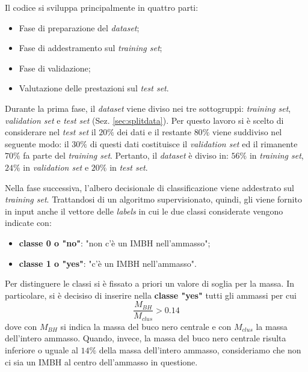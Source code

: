 Il codice si sviluppa principalmente in quattro parti:
\begin{itemize}
    \item Fase di preparazione del \textit{dataset};
    \item Fase di addestramento sul \textit{training set};
    \item Fase di validazione;
    \item Valutazione delle prestazioni sul \textit{test set}.
\end{itemize}

Durante la prima fase, il \textit{dataset} viene diviso nei tre sottogruppi: \textit{training set}, \textit{validation set} e \textit{test set} (Sez. \ref{sec:splitdata}).
Per questo lavoro si è scelto di considerare nel \textit{test set} il $20\%$ dei dati e il restante $80\%$ viene suddiviso nel seguente modo: il $30\%$ di questi dati costituisce il \textit{validation set} ed il rimanente $70\%$ fa parte del \textit{training set}. Pertanto, il \textit{dataset} è diviso in: $56\%$ in \textit{training set}, $24\%$ in \textit{validation set} e $20\%$ in \textit{test set}. 

Nella fase successiva, l'albero decisionale di classificazione viene addestrato sul \textit{training set}. Trattandosi di un algoritmo supervisionato, quindi, gli viene fornito in input anche il vettore delle \textit{labels} in cui le due classi considerate vengono indicate con:
\begin{itemize}
    \item \textbf{classe 0 o "no"}: "non c'è un IMBH nell'ammasso";
    \item \textbf{classe 1 o "yes"}: "c'è un IMBH nell'ammasso".
\end{itemize}
Per distinguere le classi si è fissato a priori un valore di soglia per la massa. In particolare, si è decisiso di inserire nella \textbf{classe "yes"} tutti gli ammassi per cui $$\frac{M_{BH}}{M_{clus}}>0.14$$ dove con $M_{BH}$ si indica la massa del buco nero centrale e con $M_{clus}$ la massa dell'intero ammasso. Quando, invece, la massa del buco nero centrale risulta inferiore o uguale al $14\%$ della massa dell'intero ammasso, consideriamo che non ci sia un IMBH al centro dell'ammasso in questione.

